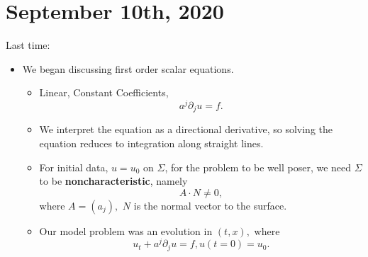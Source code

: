 \documentclass[11pt]{scrartcl}
\begin{document}
\section{September 10th, 2020}
Last time:
\begin{itemize}
\item We began discussing first order scalar equations.  
\begin{itemize}
\item Linear, Constant Coefficients, 
$$a^j \partial_j u = f.$$
\item We interpret the equation as a directional derivative, so solving the equation reduces to integration along straight lines.
\item For initial data, $u = u_0$ on $\Sigma$, for the problem to be well poser, we need $\Sigma$ to be \textbf{noncharacteristic}, namely 
$$A \cdot N \ne 0,$$
where $A = (a_j),$ $N$ is the normal vector to the surface.
\item Our model problem was an evolution in $(t, x),$ where $$u_t + a^j\partial_j u = f, u(t=0) = u_0.$$
\end{itemize}
\end{itemize}
\end{document}
